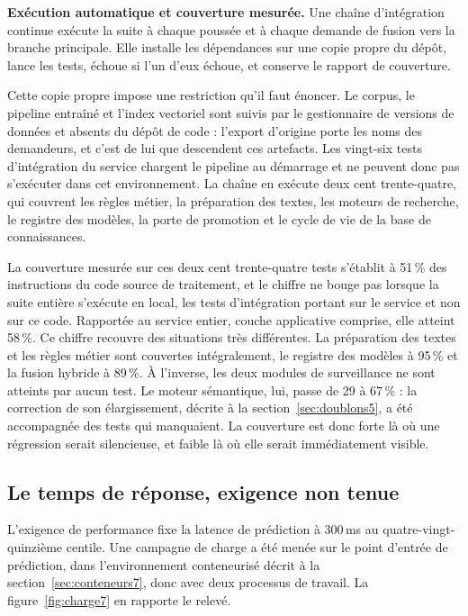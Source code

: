 \textbf{Exécution automatique et couverture mesurée.} Une chaîne d'intégration continue exécute la suite à chaque poussée et à chaque demande de fusion
vers la branche principale. Elle installe les dépendances sur une copie propre du dépôt, lance les
tests, échoue si l'un d'eux échoue, et conserve le rapport de couverture.

Cette copie propre impose une restriction qu'il faut énoncer. Le corpus, le pipeline entraîné et
l'index vectoriel sont suivis par le gestionnaire de versions de données et absents du dépôt de
code : l'export d'origine porte les noms des demandeurs, et c'est de lui que descendent ces
artefacts. Les vingt-six tests d'intégration du
service chargent le pipeline au démarrage et ne peuvent donc pas s'exécuter dans cet environnement.
La chaîne en exécute deux cent trente-quatre, qui couvrent les règles métier, la préparation des textes, les
moteurs de recherche, le registre des modèles, la porte de promotion et le cycle de vie de la base
de connaissances.

La couverture mesurée sur ces deux cent trente-quatre tests s'établit à 51\,\% des instructions du
code source de traitement, et le chiffre ne bouge pas lorsque la suite entière s'exécute en local,
les tests d'intégration portant sur le service et non sur ce code. Rapportée au service entier,
couche applicative comprise, elle atteint 58\,\%. Ce chiffre recouvre des situations très
différentes. La préparation des textes et
les règles métier sont couvertes intégralement, le registre des modèles à 95\,\% et la fusion
hybride à 89\,\%. À l'inverse, les deux modules de surveillance ne sont atteints par aucun test. Le
moteur sémantique, lui, passe de 29 à 67\,\% : la correction de son élargissement, décrite à la
section~\ref{sec:doublons5}, a été accompagnée des tests qui manquaient.
La couverture est donc forte là où une régression serait silencieuse, et faible là où elle serait
immédiatement visible.

\subsection{Le temps de réponse, exigence non tenue}

L'exigence de performance fixe la latence de prédiction à 300\,ms au quatre-vingt-quinzième
centile. Une campagne de charge a été menée sur le point d'entrée de prédiction, dans
l'environnement conteneurisé décrit à la section~\ref{sec:conteneurs7}, donc avec deux processus de
travail. La figure~\ref{fig:charge7} en rapporte le relevé.

